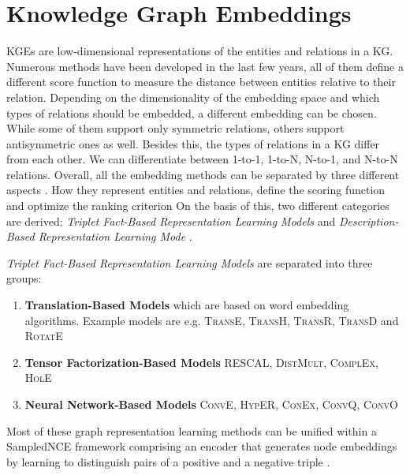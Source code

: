 \section{Knowledge Graph Embeddings} 
\acp{KGE} are low-dimensional representations of the entities and relations in a \ac{KG}. 
Numerous methods have been developed in the last few years, all of them define a different score function to measure the distance between entities relative to their relation.
Depending on the dimensionality of the embedding space and which types of relations should be embedded, a different embedding can be chosen.
While some of them support only symmetric relations, others support antisymmetric ones as well. 
Besides this, the types of relations in a \ac{KG} differ from each other.
We can differentiate between 1-to-1, 1-to-N, N-to-1, and N-to-N relations.
Overall, all the embedding methods can be separated by three different aspects \cite{electronics9050750}.
How they represent entities and relations, define the scoring function and optimize the ranking criterion
On the basis of this, two different categories are derived:
\textit{Triplet Fact-Based Representation Learning Models} and \textit{Description-Based Representation Learning Mode} \cite{electronics9050750}.

\textit{Triplet Fact-Based Representation Learning Models} are separated into three groups:
\begin{enumerate}
    \item 
    \textbf{Translation-Based Models}  which are based on word embedding algorithms. 
    Example models are e.g. \textsc{TransE}, \textsc{TransH}, \textsc{TransR}, \textsc{TransD} and \textsc{RotatE}
    
    \item 
    \textbf{Tensor Factorization-Based Models}
    \textsc{RESCAL}, \textsc{DistMult}, \textsc{ComplEx}, \textsc{HolE}
    
    \item 
    \textbf{Neural Network-Based Models}
    \textsc{ConvE}, \textsc{HypER}, \textsc{ConEx}, \textsc{ConvQ}, \textsc{ConvO}
\end{enumerate}
Most of these graph representation learning methods can be unified within a \ac{SampledNCE} framework comprising an encoder that generates node embeddings by learning to distinguish pairs of a positive and a negative triple \cite{MCNS}.


